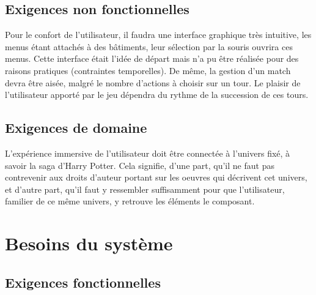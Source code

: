 \documentclass[a4paper,titlepage]{scrreprt}
\begin{document}
\section{Exigences non fonctionnelles}
  Pour le confort de l'utilisateur, il faudra  une interface graphique très intuitive, 
  les menus étant attachés à des  bâtiments, leur sélection par la souris ouvrira ces menus. Cette interface était l'idée de départ mais n'a pu être réalisée pour des raisons pratiques (contraintes temporelles).
  De même, la gestion d'un match devra être aisée, malgré le nombre d'actions à choisir 
  sur un tour. Le plaisir de l'utilisateur apporté par le jeu dépendra du rythme de la succession de ces tours.
\section{Exigences de domaine}
  L'expérience immersive de l'utilisateur doit être connectée à l'univers fixé, 
  à savoir la saga d'Harry Potter. Cela signifie, d'une part, 
  qu'il ne faut pas contrevenir aux droits d'auteur portant sur les oeuvres 
  qui décrivent cet univers, et d'autre part, qu'il faut y ressembler suffisamment pour que 
  l'utilisateur, familier de ce même univers, y retrouve les éléments le composant.

\chapter{Besoins du système}
\section{Exigences fonctionnelles}
\end{document}
